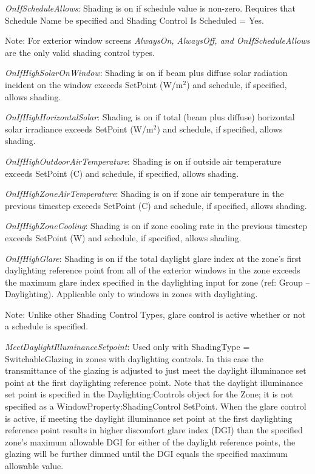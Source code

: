 \emph{OnIfScheduleAllows}: Shading is on if schedule value is non-zero. Requires that Schedule Name be specified and Shading Control Is Scheduled = Yes.

Note: For exterior window screens \emph{AlwaysOn, AlwaysOff, and OnIfScheduleAllows} are the only valid shading control types.

\emph{OnIfHighSolarOnWindow}: Shading is on if beam plus diffuse solar radiation incident on the window exceeds SetPoint (W/m\(^{2}\)) and schedule, if specified, allows shading.

\emph{OnIfHighHorizontalSolar}: Shading is on if total (beam plus diffuse) horizontal solar irradiance exceeds SetPoint (W/m\(^{2}\)) and schedule, if specified, allows shading.

\emph{OnIfHighOutdoorAirTemperature}: Shading is on if outside air temperature exceeds SetPoint (C) and schedule, if specified, allows shading.

\emph{OnIfHighZoneAirTemperature}: Shading is on if zone air temperature in the previous timestep exceeds SetPoint (C) and schedule, if specified, allows shading.

\emph{OnIfHighZoneCooling}: Shading is on if zone cooling rate in the previous timestep exceeds SetPoint (W) and schedule, if specified, allows shading.

\emph{OnIfHighGlare}: Shading is on if the total daylight glare index at the zone's first daylighting reference point from all of the exterior windows in the zone exceeds the maximum glare index specified in the daylighting input for zone (ref: Group -- Daylighting). Applicable only to windows in zones with daylighting.

Note: Unlike other Shading Control Types, glare control is active whether or not a schedule is specified.

\emph{MeetDaylightIlluminanceSetpoint}: Used only with ShadingType = SwitchableGlazing in zones with daylighting controls. In this case the transmittance of the glazing is adjusted to just meet the daylight illuminance set point at the first daylighting reference point. Note that the daylight illuminance set point is specified in the Daylighting:Controls object for the Zone; it is not specified as a WindowProperty:ShadingControl SetPoint. When the glare control is active, if meeting the daylight illuminance set point at the first daylighting reference point results in higher discomfort glare index (DGI) than the specified zone's maximum allowable DGI for either of the daylight reference points, the glazing will be further dimmed until the DGI equals the specified maximum allowable value.


